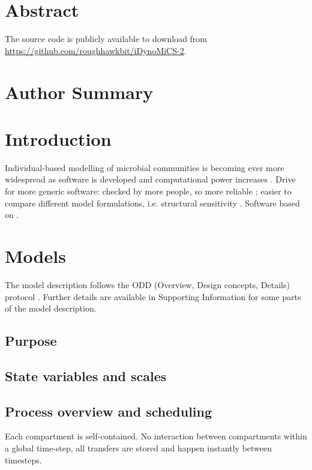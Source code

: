 \documentclass[10pt,letterpaper]{article}
\begin{document}
\section*{Abstract}


The source code is publicly available to download from \url{https://github.com/roughhawkbit/iDynoMiCS-2}.

\section*{Author Summary}

\linenumbers

\section*{Introduction}
Individual-based modelling of microbial communities is becoming ever more widespread as software is developed and computational power increases \cite{Ferrer2008}.
Drive for more generic software:
checked by more people, so more reliable \cite{Joppa2013};
easier to compare different model formulations, i.e. structural sensitivity \cite{adamson2013}.
Software based on \cite{Kreft1998, Lardon2011}.

\section*{Models}
The model description follows the ODD (Overview, Design concepts, Details) protocol \cite{Grimm2006, Grimm2010}. Further details are available in Supporting Information for some parts of the model description.

\subsection*{Purpose}


\subsection*{State variables and scales}


\subsection*{Process overview and scheduling}
Each compartment is self-contained.
No interaction between compartments within a global time-step, all transfers are stored and happen instantly between timesteps.
\end{document}
